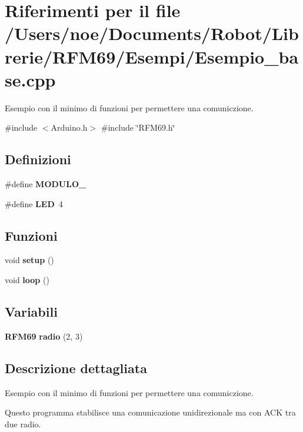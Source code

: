 \section{Riferimenti per il file /\+Users/noe/\+Documents/\+Robot/\+Librerie/\+R\+F\+M69/\+Esempi/\+Esempio\+\_\+base.cpp}
\label{_esempio__base_8cpp}


Esempio con il minimo di funzioni per permettere una comuniczione.  


{\ttfamily \#include $<$Arduino.\+h$>$}\newline
{\ttfamily \#include \char`\"{}R\+F\+M69.\+h\char`\"{}}\newline
\subsection*{Definizioni}
\begin{DoxyCompactItemize}
\item 
\mbox{\label{_esempio__base_8cpp_a779b99d2a30126dd92f22fea08d7c0f3}} 
\#define {\bfseries M\+O\+D\+U\+L\+O\+\_}
\item 
\mbox{\label{_esempio__base_8cpp_aeb7a7ba1ab7e0406f1b5ab36d579f585}} 
\#define {\bfseries L\+ED}~4
\end{DoxyCompactItemize}
\subsection*{Funzioni}
\begin{DoxyCompactItemize}
\item 
\mbox{\label{_esempio__base_8cpp_a4fc01d736fe50cf5b977f755b675f11d}} 
void {\bfseries setup} ()
\item 
\mbox{\label{_esempio__base_8cpp_afe461d27b9c48d5921c00d521181f12f}} 
void {\bfseries loop} ()
\end{DoxyCompactItemize}
\subsection*{Variabili}
\begin{DoxyCompactItemize}
\item 
\mbox{\label{_esempio__base_8cpp_a2df6ba949dd4ce1e7ee9a96a19aef0fd}} 
\textbf{ R\+F\+M69} {\bfseries radio} (2, 3)
\end{DoxyCompactItemize}


\subsection{Descrizione dettagliata}
Esempio con il minimo di funzioni per permettere una comuniczione. 

Questo programma stabilisce una comunicazione unidirezionale ma con A\+CK tra due radio. 